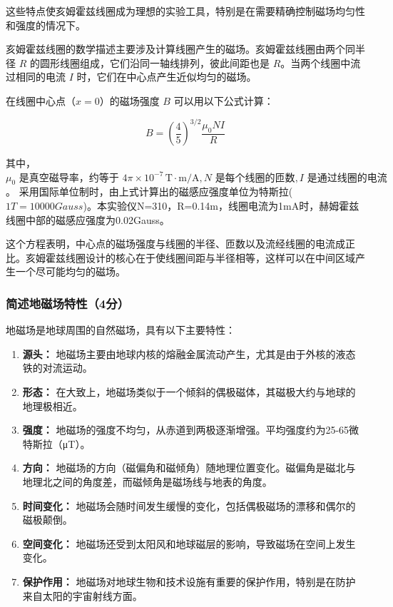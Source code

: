 \documentclass[dvipsnames, svgnames,a4paper,11pt]{article}
\begin{document}
	这些特点使亥姆霍兹线圈成为理想的实验工具，特别是在需要精确控制磁场均匀性和强度的情况下。
	
	亥姆霍兹线圈的数学描述主要涉及计算线圈产生的磁场。亥姆霍兹线圈由两个同半径 \( R \) 的圆形线圈组成，它们沿同一轴线排列，彼此间距也是 \( R \)。当两个线圈中流过相同的电流 \( I \) 时，它们在中心点产生近似均匀的磁场。
	
	在线圈中心点（\( x = 0 \)）的磁场强度 \( B \) 可以用以下公式计算：
	
	\begin{equation*}
		B = \left( \frac{4}{5} \right)^{3/2} \frac{\mu_0 N I}{R}
	\end{equation*}
	
	其中，$\mu_0 \text{ 是真空磁导率，约等于 } 4\pi \times 10^{-7} \, \text{T}\cdot\text{m/A},  N \text{ 是每个线圈的匝数},  I \text{ 是通过线圈的电流}$。 采用国际单位制时，由上式计算出的磁感应强度单位为特斯拉($1 T=10000 Gauss$)。本实验仪N=310，R=0.14m，线圈电流为1mA时，赫姆霍兹线圈中部的磁感应强度为0.02Gauss。
	
	这个方程表明，中心点的磁场强度与线圈的半径、匝数以及流经线圈的电流成正比。亥姆霍兹线圈设计的核心在于使线圈间距与半径相等，这样可以在中间区域产生一个尽可能均匀的磁场。
	
	
	\subsubsection{简述地磁场特性（4分）}
	地磁场是地球周围的自然磁场，具有以下主要特性：
	
	\begin{enumerate}
		\item \textbf{源头：} 地磁场主要由地球内核的熔融金属流动产生，尤其是由于外核的液态铁的对流运动。
		
		\item \textbf{形态：} 在大致上，地磁场类似于一个倾斜的偶极磁体，其磁极大约与地球的地理极相近。
		
		\item \textbf{强度：} 地磁场的强度不均匀，从赤道到两极逐渐增强。平均强度约为25-65微特斯拉（μT）。
		
		\item \textbf{方向：} 地磁场的方向（磁偏角和磁倾角）随地理位置变化。磁偏角是磁北与地理北之间的角度差，而磁倾角是磁场线与地表的角度。
		
		\item \textbf{时间变化：} 地磁场会随时间发生缓慢的变化，包括偶极磁场的漂移和偶尔的磁极颠倒。
		
		\item \textbf{空间变化：} 地磁场还受到太阳风和地球磁层的影响，导致磁场在空间上发生变化。
		
		\item \textbf{保护作用：} 地磁场对地球生物和技术设施有重要的保护作用，特别是在防护来自太阳的宇宙射线方面。
	\end{enumerate}
	
\end{document}
